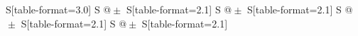 \begin{table}[h]
\begin{tabular}{S[table-format=3.0] S @{${}\pm{}$} S[table-format=2.1] S @{${}\pm{}$} S[table-format=2.1] S @{${}\pm{}$} S[table-format=2.1] S @{${}\pm{}$} S[table-format=2.1]}
    \bottomrule
    \end{tabular}
  \end{table}

